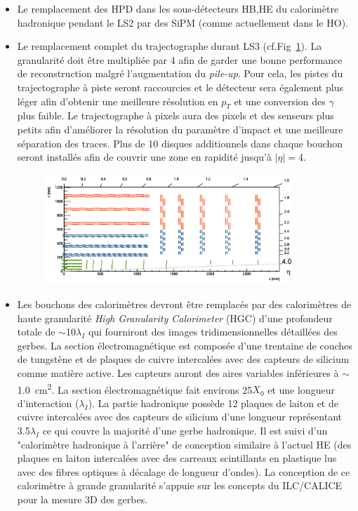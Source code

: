 \begin{itemize}[label=$\bullet$]
	\item Le remplacement des HPD dans les sous-détecteurs HB,HE du calorimètre hadronique pendant le LS2 par des SiPM (comme actuellement dans le HO).
	\item Le remplacement complet du trajectographe durant LS3 (cf.Fig~\ref{tracker2}). La granularité doit être multipliée par \num{4} afin de garder une bonne performance de reconstruction malgré l'augmentation du \textit{pile-up}. Pour cela, les pistes du trajectographe à piste seront raccourcies et le détecteur sera également plus léger afin d'obtenir une meilleure résolution en $p_{T}$ et une conversion des $\gamma$ plus faible. Le trajectographe à pixels aura des pixels et des senseurs plus petits afin d'améliorer la résolution du paramètre d'impact et une meilleure séparation des traces. Plus de \num{10} disques additionnels dans chaque bouchon seront installés afin de couvrir une zone en rapidité jusqu'à $|\eta|=$\num{4}.
	\begin{figure}[ht!]
		\centering
		\includegraphics[width=0.88\textwidth]{CMS/tracker2.png}
		\label{tracker2}
	\end{figure}
	\item Les bouchons des calorimètres devront être remplacés par des calorimètres de haute granularité \textit{High Granularity Calorimeter} (HGC) d'une profondeur totale de $\sim$\num{10}$\lambda_{I}$ qui fourniront des images tridimensionnelles détaillées des gerbes. La section électromagnétique est composée d'une trentaine de couches de tungstène et de plaques de cuivre intercalées avec des capteurs de silicium comme matière active. Les capteurs auront des aires variables inférieures à $\sim$\SI{1,0}{\square\centi\meter}. La section électromagnétique fait environs \num{25}$X_0$ et une longueur d'interaction ($\lambda_{I}$). La partie hadronique possède \num{12} plaques de laiton et de cuivre intercalées avec des capteurs de silicium d'une longueur représentant \num{3,5}$\lambda_{I}$ ce qui couvre la majorité d'une gerbe hadronique. Il est suivi d'un "calorimètre hadronique à l'arrière" de conception similaire à l'actuel HE (des plaques en laiton intercalées avec des carreaux scintillants en plastique lus avec des fibres optiques à décalage de longueur d'ondes). La conception de ce calorimètre à grande granularité s'appuie sur les concepts du ILC/CALICE pour la mesure 3D des gerbes.

\end{itemize}
